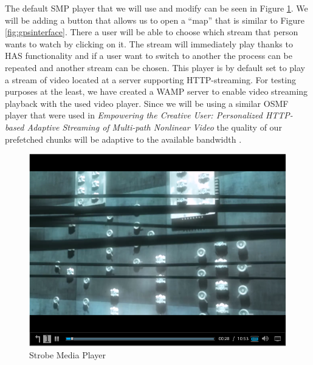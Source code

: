 \documentclass[9pt,a4paper]{acmproc}
\begin{document}
The default SMP player that we will use and modify can be seen in Figure \ref{fig:mediaplayer}. We will be adding a button that allows us to open a “map” that is similar to Figure \ref{fig:gpsinterface}. There a user will be able to choose which stream that person wants to watch by clicking on it. The stream will immediately play thanks to HAS functionality and if a user want to switch to another the process can be repeated and another stream can be chosen. This player is by default set to play a stream of video located at a server supporting HTTP-streaming. For testing purposes at the least, we have created a WAMP server to enable video streaming playback with the used video player. Since we will be using a similar OSMF player that were used in \textit{Empowering the Creative User: Personalized HTTP-based Adaptive Streaming of Multi-path Nonlinear Video} the quality of our prefetched chunks will be adaptive to the available bandwidth \cite{hasmultipath}.

\begin{figure}[t!]
\begin{center}
	\includegraphics[scale=0.5]{Media_player.png}
	\caption{Strobe Media Player}
	\label{fig:mediaplayer}
\end{center}
\end{figure}
\end{document}
